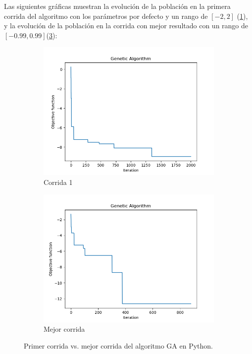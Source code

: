 \documentclass[a4paper, 12pt]{article}
\begin{document}
Las siguientes gráficas muestran la evolución de la población en la primera corrida del algoritmo con los parámetros por defecto y un rango de $[-2, 2]$ (\ref{subfig:corrida1}), y la evolución de la población en la corrida con mejor resultado con un rango de $[-0.99, 0.99]$(\ref{subfig:corrida2}):

\begin{figure}[!ht]
    \centering
    \begin{subfigure}[b]{0.48\textwidth}
        \centering
        \includegraphics[width=\textwidth]{img/corrida_1.png}
        \caption{Corrida 1}
        \label{subfig:corrida1}
    \end{subfigure}
    \hfill
    \begin{subfigure}[b]{0.48\textwidth}
        \centering
        \includegraphics[width=\textwidth]{img/corrida_4.png}
        \caption{Mejor corrida}
        \label{subfig:corrida2}
    \end{subfigure}
    \caption{Primer corrida vs. mejor corrida del algoritmo GA en Python.}
\end{figure}
\end{document}
